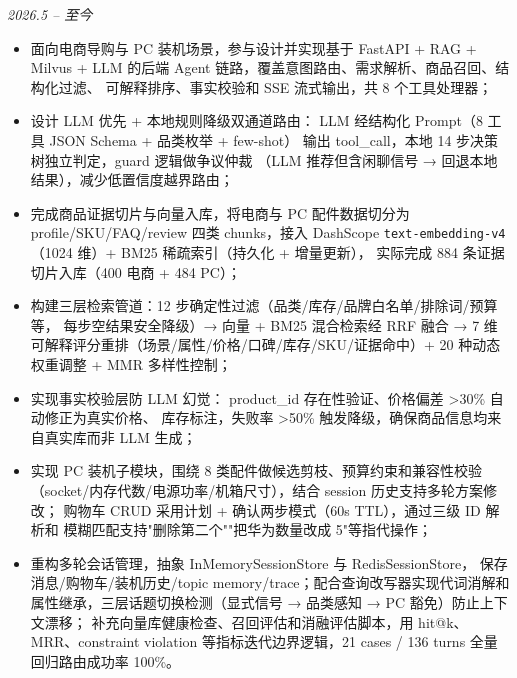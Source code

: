 {\textit{2026.5 -- 至今}}
\begin{itemize}
  \item 面向电商导购与 PC 装机场景，参与设计并实现基于
    \textcolor{HITBlueAux2}{FastAPI + RAG + Milvus + LLM}
    的后端 Agent 链路，覆盖意图路由、需求解析、商品召回、结构化过滤、
    可解释排序、事实校验和 SSE 流式输出，共 8 个工具处理器；

  \item 设计 \textcolor{HITBlueAux2}{LLM 优先 + 本地规则降级}双通道路由：
    LLM 经结构化 Prompt（8 工具 JSON Schema + 品类枚举 + few-shot）
    输出 tool\_call，本地 14 步决策树独立判定，guard 逻辑做争议仲裁
    （LLM 推荐但含闲聊信号 → 回退本地结果），减少低置信度越界路由；

  \item 完成商品证据切片与向量入库，将电商与 PC 配件数据切分为
    profile/SKU/FAQ/review 四类 chunks，接入 DashScope
    \texttt{text-embedding-v4}（1024 维）+ BM25 稀疏索引（持久化 + 增量更新），
    实际完成 \textcolor{HITBlueAux2}{884 条证据切片}入库（400 电商 + 484 PC）；

  \item 构建三层检索管道：12 步确定性过滤（品类/库存/品牌白名单/排除词/预算等，
    每步空结果安全降级）→ 向量 + BM25 混合检索经 RRF 融合 →
    7 维可解释评分重排（场景/属性/价格/口碑/库存/SKU/证据命中）+
    20 种动态权重调整 + MMR 多样性控制；

  \item 实现\textcolor{HITBlueAux2}{事实校验层}防 LLM 幻觉：
    product\_id 存在性验证、价格偏差 >30\% 自动修正为真实价格、
    库存标注，失败率 >50\% 触发降级，确保商品信息均来自真实库而非 LLM 生成；

  \item 实现 PC 装机子模块，围绕 8 类配件做候选剪枝、预算约束和兼容性校验
    （socket/内存代数/电源功率/机箱尺寸），结合 session 历史支持多轮方案修改；
    购物车 CRUD 采用计划 + 确认两步模式（60s TTL），通过三级 ID 解析和
    模糊匹配支持"删除第二个""把华为数量改成 5"等指代操作；

  \item 重构多轮会话管理，抽象 InMemorySessionStore 与 RedisSessionStore，
    保存消息/购物车/装机历史/topic memory/trace；配合查询改写器实现代词消解和
    属性继承，三层话题切换检测（显式信号 → 品类感知 → PC 豁免）防止上下文漂移；
    补充向量库健康检查、召回评估和消融评估脚本，用 hit@k、MRR、constraint
    violation 等指标迭代边界逻辑，21 cases / 136 turns 全量回归路由成功率 100\%。
\end{itemize}
